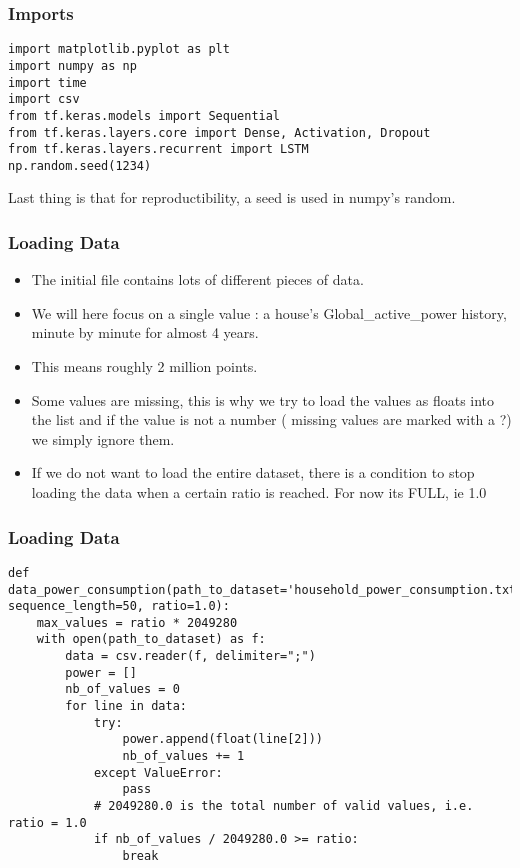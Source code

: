 \begin{frame}[fragile] \frametitle{Imports}

\begin{lstlisting}
import matplotlib.pyplot as plt
import numpy as np
import time
import csv
from tf.keras.models import Sequential
from tf.keras.layers.core import Dense, Activation, Dropout
from tf.keras.layers.recurrent import LSTM
np.random.seed(1234)
\end{lstlisting}
Last thing is that for reproductibility, a seed is used in numpy's random.
\end{frame}

\begin{frame}[fragile] \frametitle{Loading Data}

\begin{itemize}
\item The initial file contains lots of different pieces of data. 
\item We will here focus on a single value : a house's Global\_active\_power history, minute by minute for almost 4 years. 
\item This means roughly 2 million points. 
\item Some values are missing, this is why we try to load the values as floats into the list and if the value is not a number ( missing values are marked with a ?)  we simply ignore them.
\item If we do not want to load the entire dataset, there is a condition to stop loading the data when a certain ratio is reached. For now its FULL, ie 1.0
\end{itemize}
\end{frame}

\begin{frame}[fragile] \frametitle{Loading Data}

\begin{lstlisting}
def data_power_consumption(path_to_dataset='household_power_consumption.txt', sequence_length=50, ratio=1.0):
    max_values = ratio * 2049280
    with open(path_to_dataset) as f:
        data = csv.reader(f, delimiter=";")
        power = []
        nb_of_values = 0
        for line in data:
            try:
                power.append(float(line[2]))
                nb_of_values += 1
            except ValueError:
                pass
            # 2049280.0 is the total number of valid values, i.e. ratio = 1.0
            if nb_of_values / 2049280.0 >= ratio:
                break
\end{lstlisting}

\end{frame}

